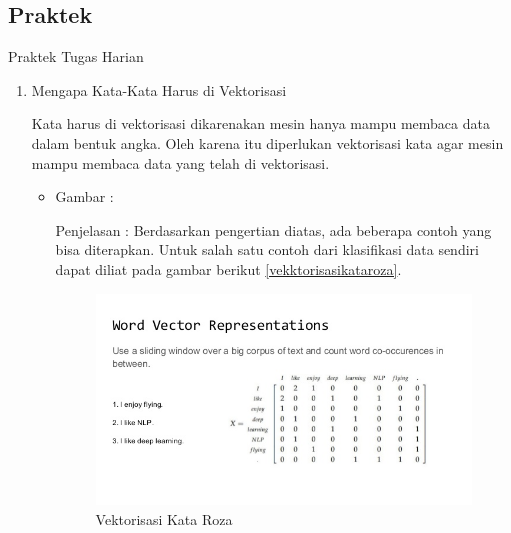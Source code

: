 \subsection{Praktek}
Praktek Tugas Harian 
\begin{enumerate}

\item Mengapa Kata-Kata Harus di Vektorisasi
\par Kata harus di vektorisasi dikarenakan mesin hanya mampu membaca data dalam bentuk angka. Oleh karena itu diperlukan vektorisasi kata agar mesin mampu membaca data yang telah di vektorisasi. 
\par
\begin{itemize}
\item Gambar :
\par Penjelasan : Berdasarkan pengertian diatas, ada beberapa contoh yang bisa diterapkan. Untuk salah satu contoh dari klasifikasi data sendiri dapat diliat pada gambar berikut \ref{vekktorisasikataroza}.
\begin{figure}[!hbtp]
\centering
\includegraphics[scale=0.6]{figures/vekktorisasikataroza.jpg}
\caption{Vektorisasi Kata Roza}
\label{text-fadila}
\end{figure}
\end{itemize}


\end{enumerate}
